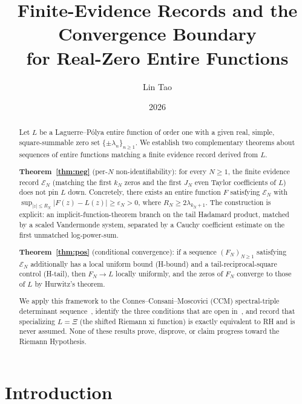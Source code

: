 \documentclass[12pt]{amsart}
\theoremstyle{definition}
\theoremstyle{remark}
\theoremstyle{plain}
\begin{document}
\title[Convergence Boundary for Real-Zero Entire Functions]{%
  Finite-Evidence Records and the Convergence Boundary\\
  for Real-Zero Entire Functions}

\author{Lin Tao}
\date{2026}

\begin{abstract}
Let $L$ be a Laguerre--P\'olya entire function of order one with a given real,
simple, square-summable zero set $\{\pm\lambda_n\}_{n\geq 1}$.
We establish two complementary theorems about sequences of entire functions
matching a finite evidence record derived from $L$.

\textbf{Theorem~\ref{thm:neg}} (per-$N$ non-identifiability): for every $N\geq 1$,
the finite evidence record $\mathcal{E}_N$ (matching the first $k_N$ zeros and
the first $J_N$ even Taylor coefficients of $L$) does not pin $L$ down.
Concretely, there exists an entire function $F$ satisfying $\mathcal{E}_N$ with
$\sup_{|z|\leq R_N}|F(z)-L(z)|\geq\varepsilon_N > 0$, where $R_N\geq 2\lambda_{k_N+1}$.
The construction is explicit: an implicit-function-theorem branch on the tail
Hadamard product, matched by a scaled Vandermonde system, separated by a
Cauchy coefficient estimate on the first unmatched log-power-sum.

\textbf{Theorem~\ref{thm:pos}} (conditional convergence): if a sequence
$(F_N)_{N\geq 1}$ satisfying $\mathcal{E}_N$ additionally has a local uniform
bound (H-bound) and a tail-reciprocal-square control (H-tail), then $F_N\to L$
locally uniformly, and the zeros of $F_N$ converge to those of $L$ by
Hurwitz's theorem.

We apply this framework to the Connes--Consani--Moscovici (CCM)
spectral-triple determinant sequence~\cite{CCM2025}, identify the three
conditions that are open in~\cite{CCM2025}, and record that specializing
$L=\Xi$ (the shifted Riemann xi function) is exactly equivalent to RH and
is never assumed. None of these results prove, disprove, or claim progress
toward the Riemann Hypothesis.
\end{abstract}

\maketitle
\tableofcontents

\section{Introduction}
\label{sec:intro}
\end{document}
